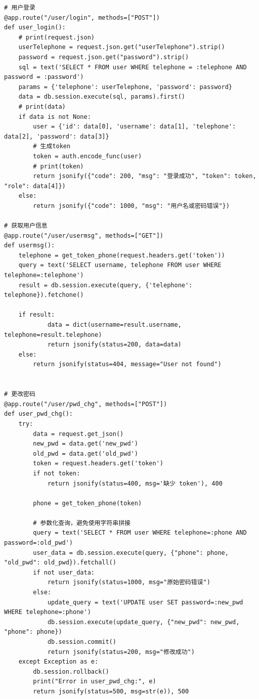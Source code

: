 \documentclass[a4paper,AutoFakeBold={2.7}]{ctexart} %
\begin{document}
\begin{lstlisting}
# 用户登录
@app.route("/user/login", methods=["POST"])
def user_login():
    # print(request.json)
    userTelephone = request.json.get("userTelephone").strip()
    password = request.json.get("password").strip()
    sql = text('SELECT * FROM user WHERE telephone = :telephone AND password = :password')
    params = {'telephone': userTelephone, 'password': password}
    data = db.session.execute(sql, params).first()
    # print(data)
    if data is not None:
        user = {'id': data[0], 'username': data[1], 'telephone': data[2], 'password': data[3]}
        # 生成token
        token = auth.encode_func(user)
        # print(token)
        return jsonify({"code": 200, "msg": "登录成功", "token": token, "role": data[4]})
    else:
        return jsonify({"code": 1000, "msg": "用户名或密码错误"})

# 获取用户信息
@app.route("/user/usermsg", methods=["GET"])
def usermsg():
    telephone = get_token_phone(request.headers.get('token'))
    query = text('SELECT username, telephone FROM user WHERE telephone=:telephone')
    result = db.session.execute(query, {'telephone': telephone}).fetchone()

    if result:
            data = dict(username=result.username, telephone=result.telephone)
            return jsonify(status=200, data=data)
    else:
        return jsonify(status=404, message="User not found")


# 更改密码
@app.route("/user/pwd_chg", methods=["POST"])
def user_pwd_chg():
    try:
        data = request.get_json()
        new_pwd = data.get('new_pwd')
        old_pwd = data.get('old_pwd')
        token = request.headers.get('token')
        if not token:
            return jsonify(status=400, msg='缺少 token'), 400

        phone = get_token_phone(token)

        # 参数化查询，避免使用字符串拼接
        query = text('SELECT * FROM user WHERE telephone=:phone AND password=:old_pwd')
        user_data = db.session.execute(query, {"phone": phone, "old_pwd": old_pwd}).fetchall()
        if not user_data:
            return jsonify(status=1000, msg="原始密码错误")
        else:
            update_query = text('UPDATE user SET password=:new_pwd WHERE telephone=:phone')
            db.session.execute(update_query, {"new_pwd": new_pwd, "phone": phone})
            db.session.commit()
            return jsonify(status=200, msg="修改成功")
    except Exception as e:
        db.session.rollback()
        print("Error in user_pwd_chg:", e)
        return jsonify(status=500, msg=str(e)), 500



\end{lstlisting}
\end{document}
